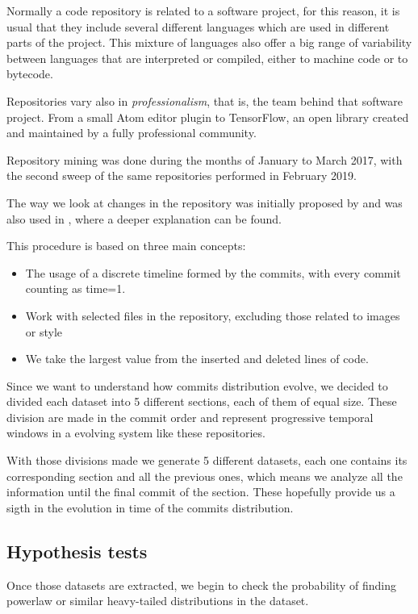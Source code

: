 \documentclass[conference]{IEEEtran}
\begin{document}
Normally a code repository is related to a software project, for this
reason, it is usual that they include several different languages
which are used in different parts of the project.  This mixture of
languages also offer a big range of variability between languages that
are interpreted or compiled, either to machine code or to bytecode.

Repositories vary also in {\em professionalism}, that is, the team
behind that software project. From a small Atom editor plugin to
TensorFlow, an open library created and maintained by a fully
professional community.

Repository mining was done during the months of January to March 2017,
with the second sweep of the same repositories performed in February
2019.

The way we look at changes in the repository was initially proposed by
\cite{Merelo2016:repomining} and was also used in
\cite{merelo2017self}, where a deeper explanation can be found.


This procedure is based on three main concepts:
\begin{itemize}
\item The usage of a discrete timeline formed by the commits, with
  every commit counting as time=1.
\item Work with selected files in the repository, excluding those
  related to images or style
\item We take the largest value from the inserted and deleted lines of
  code.
\end{itemize}

Since we want to understand how commits distribution evolve, we
decided to divided each dataset into 5 different sections, each of
them of equal size. These division are made in the commit order and
represent progressive temporal windows in a evolving system like these
repositories.

With those divisions made we generate 5 different datasets, each one
contains its corresponding section and all the previous ones, which
means we analyze all the information until the final commit of the
section.  These hopefully provide us a sigth in the evolution in time
of the commits distribution.


\subsection{Hypothesis tests}

Once those datasets are extracted, we begin to check the probability
of finding powerlaw or similar heavy-tailed distributions in the
dataset.
\end{document}
